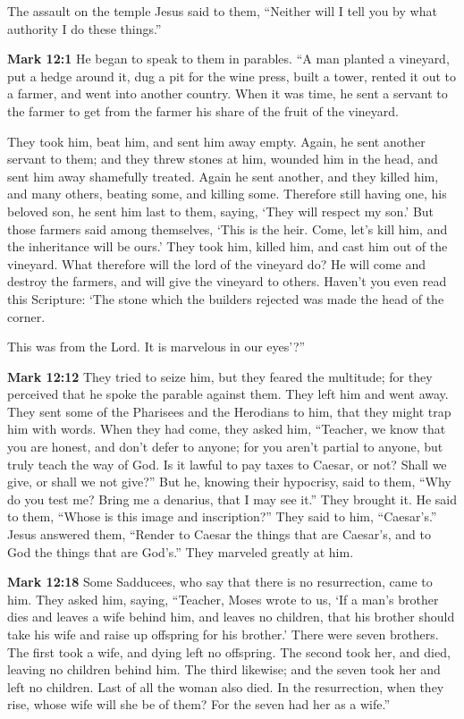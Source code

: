 \documentclass[10pt,twoside]{article} %
\newcommand{\quotesize}{\normalsize{}}
\newenvironment{quotetext}{\begingroup\quotesize}{\endgroup}
\newcommand{\bible}[2]{\begin{quotetext}\textbf{#1} #2\end{quotetext}}
\newcommand{\gospelmark}[2]{\bible{Mark #1}{#2}}
\begin{document}
\begin{section}{The assault on the temple}
{Jesus said to them, ``Neither will I tell you by what authority I do these things.'' 
}

\gospelmark{12:1}{
   He began to speak to them in parables. ``A man planted a vineyard, put a hedge around it, dug a pit for the wine press, built a tower, rented it out to a farmer, and went into another country.    When it was time, he sent a servant to the farmer to get from the farmer his share of the fruit of the vineyard.   

 They took him, beat him, and sent him away empty.    Again, he sent another servant to them; and they threw stones at him, wounded him in the head, and sent him away shamefully treated.    Again he sent another, and they killed him, and many others, beating some, and killing some.    Therefore still having one, his beloved son, he sent him last to them, saying, `They will respect my son.'    But those farmers said among themselves, `This is the heir. Come, let's kill him, and the inheritance will be ours.'    They took him, killed him, and cast him out of the vineyard.    What therefore will the lord of the vineyard do? He will come and destroy the farmers, and will give the vineyard to others.    Haven't you even read this Scripture:
`The stone which the builders rejected
was made the head of the corner.

   This was from the Lord.
It is marvelous in our eyes'?''
}

\gospelmark{12:12}{
 They tried to seize him, but they feared the multitude; for they perceived that he spoke the parable against them. They left him and went away.   They sent some of the Pharisees and the Herodians to him, that they might trap him with words.   When they had come, they asked him, ``Teacher, we know that you are honest, and don't defer to anyone; for you aren't partial to anyone, but truly teach the way of God. Is it lawful to pay taxes to Caesar, or not?   Shall we give, or shall we not give?''
But he, knowing their hypocrisy, said to them, ``Why do you test me? Bring me a denarius, that I may see it.''
  They brought it.
He said to them, ``Whose is this image and inscription?''
They said to him, ``Caesar's.''
  Jesus answered them, ``Render to Caesar the things that are Caesar's, and to God the things that are God's.''
They marveled greatly at him. 
}

\gospelmark{12:18}{
Some Sadducees, who say that there is no resurrection, came to him. They asked him, saying,   ``Teacher, Moses wrote to us, `If a man's brother dies and leaves a wife behind him, and leaves no children, that his brother should take his wife and raise up offspring for his brother.'   There were seven brothers. The first took a wife, and dying left no offspring.   The second took her, and died, leaving no children behind him. The third likewise;   and the seven took her and left no children. Last of all the woman also died.   In the resurrection, when they rise, whose wife will she be of them? For the seven had her as a wife.''

}
\end{section}
\end{document}
